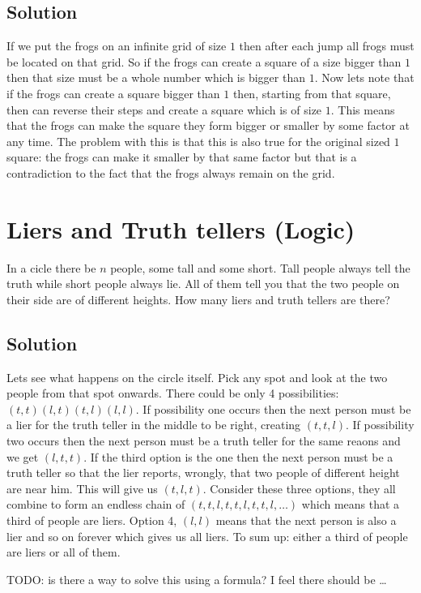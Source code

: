 \documentclass{article}
\begin{document}
\subsection{Solution}
If we put the frogs on an infinite grid of size $1$ then after each jump all frogs must be located on that grid. So if the frogs can create a square of a size bigger than $1$ then that size must be a whole number which is bigger than $1$. Now lets note that if the frogs can create a square bigger than $1$ then, starting from that square, then can reverse their steps and create a square which is of size $1$. This means that the frogs can make the square they form bigger or smaller by some factor at any time. The problem with this is that this is also true for the original sized $1$ square: the frogs can make it smaller by that same factor but that is a contradiction to the fact that the frogs always remain on the grid.

\section{Liers and Truth tellers (Logic)}
In a cicle there be $n$ people, some tall and some short. Tall people always tell the truth while short people always lie. All of them tell you that the two people on their side are of different heights. How many liers and truth tellers are there?

\subsection{Solution}
Lets see what happens on the circle itself. Pick any spot and look at the two people from that spot onwards. There could be only 4 possibilities: $(t,t) (l,t) (t,l) (l,l)$. If possibility one occurs then the next person must be a lier for the truth teller in the middle to be right, creating $(t,t,l)$. If possibility two occurs then the next person must be a truth teller for the same reaons and we get $(l,t,t)$. If the third option is the one then the next person must be a truth teller so that the lier reports, wrongly, that two people of different height are near him. This will give us $(t,l,t)$. Consider these three options, they all combine to form an endless chain of $(t,t,l,t,t,l,t,t,l,\ldots)$ which means that a third of people are liers. Option 4, $(l,l)$ means that the next person is also a lier and so on forever which gives us all liers. To sum up: either a third of people are liers or all of them.

TODO: is there a way to solve this using a formula? I feel there should be \ldots
\end{document}
